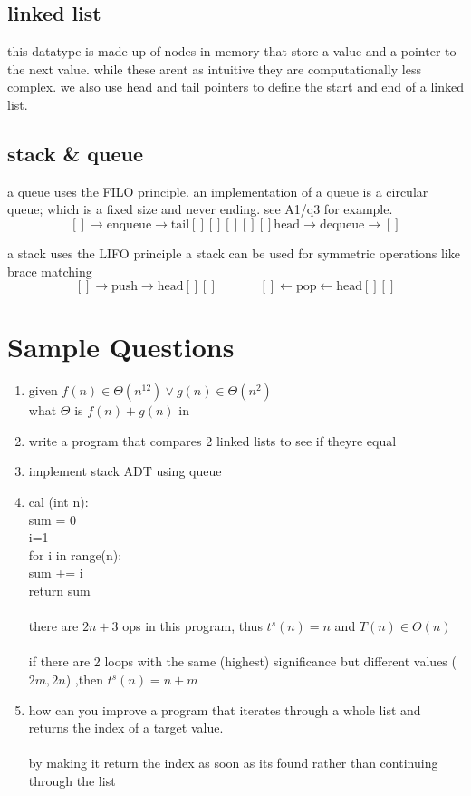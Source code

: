 \documentclass[12pt]{book}
\begin{document}
\subsection*{linked list}
this datatype is made up of nodes in memory that store a value and a pointer to the next value.
while these arent as intuitive they are computationally less complex.
we also use head and tail pointers to define the start and end of a linked list.

{
\footnotesize
\subsection*{stack \& queue}
a queue uses the FILO principle.
an implementation of a queue is a circular queue; which is a fixed size and never ending.
see A1/q3 for example.
\[[]\rightarrow \text{enqueue}\rightarrow \text{tail}[][][][][]
\text{head}\rightarrow\text{dequeue}\rightarrow[]\]

a stack uses the LIFO principle
a stack can be used for symmetric operations like brace matching
\[[]\rightarrow\text{push}\rightarrow\text{head}[][]\;\;\;\;\;\;
\;\;\;\;\;\;[]\leftarrow\text{pop}\leftarrow\text{head}[][]\]
}
\pagebreak

\section*{Sample Questions}
\begin{enumerate}
        \item given $f(n)\in\Theta(n^{12})\vee g(n)\in\Theta(n^2)$\\
             what $ \Theta $ is $f(n)+g(n)$ in
        
        \item write a program that compares 2 linked lists to see if theyre equal

        \item implement stack ADT using queue

        \item cal (int n):\\
                sum = 0\\
                i=1\\
                for i in range(n):\\
                sum += i\\
                return sum\\
                \\
                there are $2n+3$ ops in this program, thus  $t^s(n)=n$ and $T(n) \in O(n)$\\
                \\
                if there are 2 loops with the same (highest) significance but different values ($2m, 2n$)
                ,then $t^s(n) = n+m$

        \item how can you improve a program that iterates through a whole list and returns the index
                of a target value.\\
                \\
                by making it return the index as soon as its found rather than continuing through the 
                list
\end{enumerate}
\end{document}
